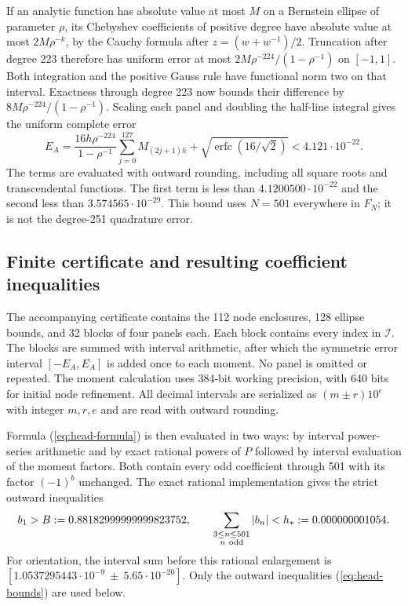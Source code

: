 \documentclass[11pt]{article}
\theoremstyle{definition}\newtheorem{definition}[theorem]{Definition}
\newcommand{\erfc}{\operatorname{erfc}}
\begin{document}
If an analytic function has absolute value at most $M$ on a Bernstein
ellipse of parameter $\rho$, its Chebyshev coefficients of positive
degree have absolute value at most $2M\rho^{-k}$, by the Cauchy formula
after $z=(w+w^{-1})/2$. Truncation after degree 223 therefore has uniform
error at most $2M\rho^{-224}/(1-\rho^{-1})$ on $[-1,1]$.
Both integration and the positive Gauss rule have functional norm two
on that interval. Exactness through degree 223 now bounds their
difference by $8M\rho^{-224}/(1-\rho^{-1})$. Scaling each panel and
doubling the half-line integral gives the uniform complete error
\begin{equation}\label{eq:uniform-error}
 E_A=\frac{16h\rho^{-224}}{1-\rho^{-1}}
           \sum_{j=0}^{127}M_{(2j+1)h}
           +\sqrt{\erfc(16/\sqrt2)}<4.121\cdot10^{-22}.
\end{equation}
The terms are evaluated with outward rounding, including all square
roots and transcendental functions. The first term is less than
$4.1200500\cdot10^{-22}$ and the second less than
$3.574565\cdot10^{-29}$. This bound uses $N=501$ everywhere in
$F_N$; it is not the degree-251 quadrature error.

\subsection{Finite certificate and resulting coefficient inequalities}
The accompanying certificate contains the 112 node enclosures, 128
ellipse bounds, and 32 blocks of four panels each. Each block contains
every index in $\mathcal I$. The blocks are summed with interval
arithmetic, after which the symmetric error interval $[-E_A,E_A]$ is
added once to each moment. No panel is omitted or repeated. The moment
calculation uses 384-bit working precision, with 640 bits for initial
node refinement. All decimal intervals are serialized as
$(m\pm r)10^e$ with integer $m,r,e$ and are read with outward rounding.

Formula (\ref{eq:head-formula}) is then evaluated in two ways: by
interval power-series arithmetic and by exact rational powers of $P$
followed by interval evaluation of the moment factors. Both contain
every odd coefficient through 501 with its factor $(-1)^b$ unchanged.
The exact rational implementation gives the strict outward inequalities
\begin{equation}\label{eq:head-bounds}
 b_1>B:=0.88182999999999823752,
 \qquad \sum_{\substack{3\leq n\leq501\\n\ {\rm odd}}}|b_n|
       <h_*:=0.000000001054.
\end{equation}
For orientation, the interval sum before this rational enlargement is
$[1.0537295443\cdot10^{-9}\ \pm\ 5.65\cdot10^{-20}]$.
Only the outward inequalities (\ref{eq:head-bounds}) are used below.



\appendix



\end{document}
